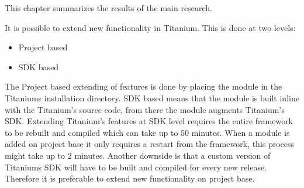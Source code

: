 



This chapter summarizes the results of the main research.



It is possible to extend new functionality in Titanium. This is done at two levels:
\begin{itemize}
	\item Project based
	\item SDK based
\end{itemize}
The Project based extending of features is done by placing the module in the Titaniums installation directory. SDK based means that the module is built inline with the Titanium's source code, from there the module augments Titanium's SDK.  Extending Titanium's features at SDK level requires the entire framework to be rebuilt and compiled which can take up to 50 minutes. When a module is added on project base it only requires a restart from the framework, this process might take up to 2 minutes. Another downside is that a custom version of Titaniums SDK will have to be built and compiled for every new release. Therefore it is preferable to extend new functionality on project base.



